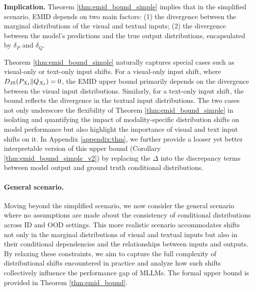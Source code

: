 

\begin{tcolorbox}[width=\linewidth, colback=white!95!black]
\noindent \textbf{Implication.} 
Theorem \ref{thm:emid_bound_simple} implies that in the simplified scenario, EMID depends on two main factors: (1) the divergence between the marginal distributions of the visual and textual inputs;
(2) the divergence between the model’s predictions and the true output distributions, encapsulated by $\delta_P$ and $\delta_Q$.
\end{tcolorbox}
Theorem \ref{thm:emid_bound_simple} naturally captures special cases such as visual-only or text-only input shifts. For a visual-only input shift, where $D_{\rm JS}(P_{X_{t}} \| Q_{X_{t}}) = 0$, the EMID upper bound primarily depends on the divergence between the visual input distributions. Similarly, for a text-only input shift, the bound reflects the divergence in the textual input distributions. The two cases not only underscore the flexibility of Theorem \ref{thm:emid_bound_simple} in isolating and quantifying the impact of modality-specific distribution shifts on model performance but also highlight the importance of visual and text input shifts on it. In Appendix \ref{appendix:thm}, we further provide a looser yet better interpretable version of this upper bound (Corollary \ref{thm:emid_bound_simple_v2}) by replacing the $\Delta$ into the discrepancy terms between model output and ground truth conditional distributions.


\paragraph{General scenario.} Moving beyond the simplified scenario, we now consider the general scenario where no assumptions are made about the consistency of conditional distributions across ID and OOD settings. This more realistic scenario accommodates shifts not only in the marginal distributions of visual and textual inputs but also in their conditional dependencies and the relationships between inputs and outputs. By relaxing these constraints, we aim to capture the full complexity of distributional shifts encountered in practice and analyze how such shifts collectively influence the performance gap of MLLMs. The formal upper bound is provided in Theorem \ref{thm:emid_bound}.


